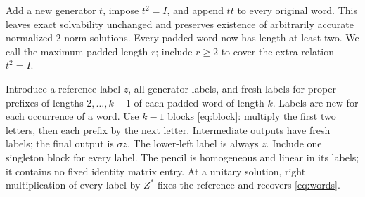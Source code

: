 \documentclass[11pt]{article}
\begin{document}
Add a new generator $t$, impose $t^2=I$, and append $tt$ to every original word. This leaves exact solvability unchanged and preserves existence of arbitrarily accurate normalized-$2$-norm solutions. Every padded word now has length at least two. We call the maximum padded length $r$; include $r\ge2$ to cover the extra relation $t^2=I$.

Introduce a reference label $z$, all generator labels, and fresh labels for proper prefixes of lengths $2,\ldots,k-1$ of each padded word of length $k$. Labels are new for each occurrence of a word. Use $k-1$ blocks \eqref{eq:block}: multiply the first two letters, then each prefix by the next letter. Intermediate outputs have fresh labels; the final output is $\sigma z$. The lower-left label is always $z$. Include one singleton block for every label. The pencil is homogeneous and linear in its labels; it contains no fixed identity matrix entry. At a unitary solution, right multiplication of every label by $Z^*$ fixes the reference and recovers \eqref{eq:words}.
\end{document}
